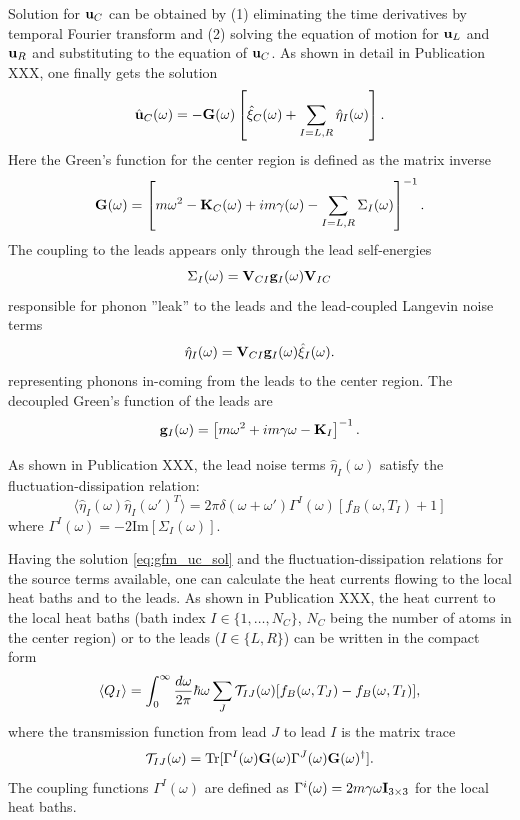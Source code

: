 Solution for $\mathbf{u}_C$ can be obtained by (1) eliminating the time derivatives by temporal Fourier transform and (2) solving the equation of motion for $\mathbf{u}_L$ and $\mathbf{u}_R$ and substituting to the equation of $\mathbf{u}_C$. As shown in detail in Publication XXX, one finally gets the solution
\begin{equation}
 \hat{\mathbf{u}}_C(\omega) = - \mathbf{G}(\omega) \left[ \hat\xi_C(\omega) + \sum_{I=L,R} \hat{\eta}_I(\omega) \right]. \label{eq:gfm_uc_sol}
\end{equation}
Here the Green's function for the center region is defined as the matrix inverse
\begin{equation}
 \mathbf{G}(\omega) = \left[m\omega^2 - \mathbf{K}_C(\omega) +im\gamma(\omega) - \sum_{I=L,R} \Sigma_I(\omega)  \right]^{-1}.
\end{equation}
The coupling to the leads appears only through the lead self-energies
\begin{equation}
 \Sigma_I(\omega) = \mathbf{V}_{CI} \mathbf{g}_I(\omega) \mathbf{V}_{IC} 
\end{equation}
responsible for phonon ''leak'' to the leads and the lead-coupled Langevin noise terms
\begin{equation}
 \hat\eta_I(\omega) = \mathbf{V}_{CI}\mathbf{g}_I(\omega) \hat{\xi}_I(\omega).
\end{equation}
representing phonons in-coming from the leads to the center region. The decoupled Green's function of the leads are
\begin{equation}
 \mathbf{g}_I(\omega) = \left[m\omega^2+im\gamma\omega - \mathbf{K}_I \right]^{-1}.
\end{equation}

As shown in Publication XXX, the lead noise terms $\hat\eta_I(\omega)$ satisfy the fluctuation-dissipation relation:
\begin{equation}
 \langle \hat\eta_I(\omega) \hat\eta_I(\omega')^T \rangle=2\pi\delta(\omega+\omega') \Gamma^I(\omega) \left[f_B(\omega,T_I)+1 \right]
\end{equation}
where $\Gamma^I(\omega)=-2\textrm{Im}[\Sigma_I(\omega)]$.

Having the solution \eqref{eq:gfm_uc_sol} and the fluctuation-dissipation relations for the source terms available, one can calculate the heat currents flowing to the local heat baths and to the leads. As shown in Publication XXX, the heat current to the local heat baths (bath index $I\in \{1,\dots,N_C\}$, $N_C$ being the number of atoms in the center region) or to the leads ($I \in \{L,R\}$) can be written in the compact form
\begin{equation}
 \langle Q_I \rangle =  \int_0^{\infty} \frac{d\omega}{2\pi} \hbar \omega \sum_{J} \mathcal{T}_{IJ}(\omega)[f_B(\omega,T_J)-f_B(\omega,T_I)], \label{eq:gfm_qi}
\end{equation}
where the transmission function from lead $J$ to lead $I$ is the matrix trace 
\begin{equation}
 \mathcal{T}_{IJ}(\omega) = \textrm{Tr}[\Gamma^I(\omega) \mathbf{G}(\omega) \Gamma^J(\omega) \mathbf{G}(\omega)^{\dagger}]. \label{eq:gfm_caroli}
\end{equation}
The coupling functions $\Gamma^I(\omega)$ are defined as $\Gamma^i(\omega)=2m\gamma\omega \mathbf{I}_{3\times3}$ for the local heat baths.

